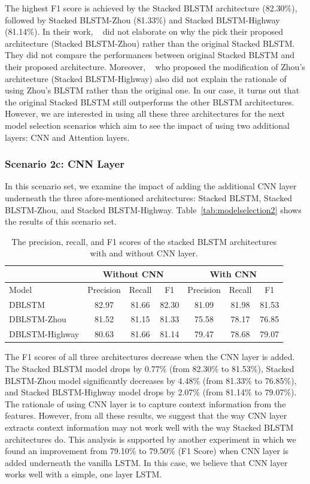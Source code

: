 The highest F1 score is achieved by the Stacked BLSTM architecture (82.30\%), followed by Stacked BLSTM-Zhou (81.33\%) and Stacked BLSTM-Highway (81.14\%). In their work, ~\cite{zhou2015end} did not elaborate on why the pick their proposed architecture (Stacked BLSTM-Zhou) rather than the original Stacked BLSTM. They did not compare the performances between original Stacked BLSTM and their proposed architecture. Moreover, ~\cite{he2017deep} who proposed the modification of Zhou's architecture (Stacked BLSTM-Highway) also did not explain the rationale of using Zhou's BLSTM rather than the original one. In our case, it turns out that the original Stacked BLSTM still outperforms the other BLSTM architectures. However, we are interested in using all these three architectures for the next model selection scenarios which aim to see the impact of using two additional layers: CNN and Attention layers.

\subsubsection{Scenario 2c: CNN Layer}
In this scenario set, we examine the impact of adding the additional CNN layer underneath the three afore-mentioned architectures: Stacked BLSTM, Stacked BLSTM-Zhou, and Stacked BLSTM-Highway. Table~\ref{tab:modelselection2} shows the results of this scenario set.

\begin{table}
	\caption{The precision, recall, and F1 scores of the stacked BLSTM architectures with and without CNN layer.}
	\centering
	\label{tab:modelselection3}
	\begin{tabular}{|l|ccc|ccc|}
		\hline
		& \multicolumn{3}{c}{ Without CNN } & \multicolumn{3}{c}{ With CNN } \\
		\hline
		Model& Precision & Recall & F1 & Precision & Recall & F1 \\
		\hline \hline
		DBLSTM & 82.97 & 81.66 & 82.30 & 81.09 & 81.98 & 81.53 \\
		DBLSTM-Zhou & 81.52 & 81.15 & 81.33 & 75.58 & 78.17 & 76.85 \\
		DBLSTM-Highway & 80.63 & 81.66 & 81.14 & 79.47& 78.68& 79.07 \\
		\hline
	\end{tabular}

\end{table}

The F1 scores of all three architectures decrease when the CNN layer is added. The Stacked BLSTM model drops by 0.77\% (from 82.30\% to 81.53\%), Stacked BLSTM-Zhou model significantly decreases by 4.48\% (from 81.33\% to 76.85\%), and Stacked BLSTM-Highway model drops by 2.07\% (from 81.14\% to 79.07\%). The rationale of using CNN layer is to capture context information from the features. However, from all these results, we suggest that the way CNN layer extracts context information may not work well with the way Stacked BLSTM architectures do. This analysis is supported by another experiment in which we found an improvement from 79.10\% to 79.50\% (F1 Score) when CNN layer is added underneath the vanilla LSTM. In this case, we believe that CNN layer works well with a simple, one layer LSTM.

